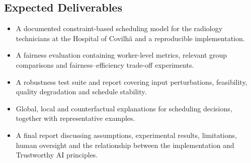 \documentclass[11pt,a4paper]{article}
\begin{document}
\subsection*{Expected Deliverables}

\begin{itemize}
    \setlength{\itemsep}{0pt}
    \setlength{\parskip}{0pt}
    \item A documented constraint-based scheduling model for the radiology technicians at the Hospital of Covilh\~a  and a reproducible implementation.
    \item A fairness evaluation containing worker-level metrics, relevant group comparisons and fairness--efficiency trade-off experiments.
    \item A robustness test suite and report covering input perturbations, feasibility, quality degradation and schedule stability.
    \item Global, local and counterfactual explanations for scheduling decisions, together with representative examples.
    \item A final report discussing assumptions, experimental results, limitations, human oversight and the relationship between the implementation and Trustworthy AI principles.
\end{itemize}
\end{document}
